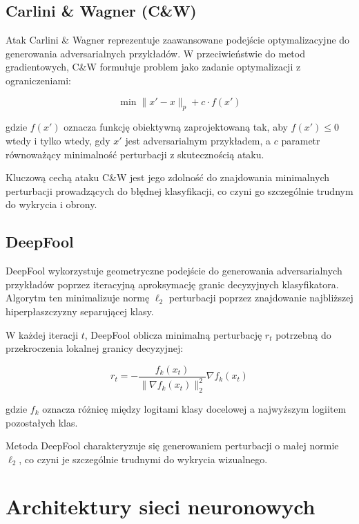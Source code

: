 \documentclass[12pt]{article}
\begin{document}
\subsection{Carlini \& Wagner (C\&W)}

Atak Carlini \& Wagner \cite{carlini2017towards} reprezentuje zaawansowane podejście optymalizacyjne do generowania adversarialnych przykładów. W przeciwieństwie do metod gradientowych, C\&W formułuje problem jako zadanie optymalizacji z ograniczeniami:

\begin{equation}
    \min \|x' - x\|_p + c \cdot f(x')
\end{equation}

gdzie $f(x')$ oznacza funkcję obiektywną zaprojektowaną tak, aby $f(x') \leq 0$ wtedy i tylko wtedy, gdy $x'$ jest adversarialnym przykładem, a $c$ parametr równoważący minimalność perturbacji z skutecznością ataku.

Kluczową cechą ataku C\&W jest jego zdolność do znajdowania minimalnych perturbacji prowadzących do błędnej klasyfikacji, co czyni go szczególnie trudnym do wykrycia i obrony.

\subsection{DeepFool}

DeepFool \cite{moosavi2016deepfool} wykorzystuje geometryczne podejście do generowania adversarialnych przykładów poprzez iteracyjną aproksymację granic decyzyjnych klasyfikatora. Algorytm ten minimalizuje normę $\ell_2$ perturbacji poprzez znajdowanie najbliższej hiperpłaszczyzny separującej klasy.

W każdej iteracji $t$, DeepFool oblicza minimalną perturbację $r_t$ potrzebną do przekroczenia lokalnej granicy decyzyjnej:

\begin{equation}
    r_t = -\frac{f_k(x_t)}{\|\nabla f_k(x_t)\|_2^2} \nabla f_k(x_t)
\end{equation}

gdzie $f_k$ oznacza różnicę między logitami klasy docelowej a najwyższym logiitem pozostałych klas.

Metoda DeepFool charakteryzuje się generowaniem perturbacji o małej normie $\ell_2$, co czyni je szczególnie trudnymi do wykrycia wizualnego.

\section{Architektury sieci neuronowych}
\end{document}
